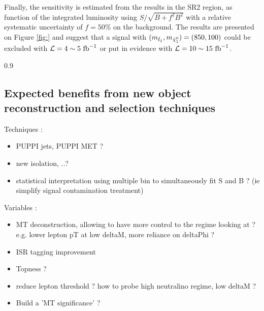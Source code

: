         \begin{table}
            \centering
            
            \caption{ \label{tab:phys14SignalRegions}}
        \end{table}

       Finally, the sensitivity is estimated from the results in the SR2 region, as function
       of the integrated luminosity using $S / \sqrt{B + f^2 B^2}$ with a relative systematic
       uncertainty of $f = 50\%$ on the background. The results are presented on Figure
       \ref{fig:} and suggest that a signal with $(m_{\tilde{t}_1}, m_{\tilde{\chi}_1^0}) = (850,100)$
       could be excluded with $\mathcal{L} = 4\sim5~\text{fb}^{-1}$ or put in evidence with
       $\mathcal{L} = 10\sim15~\text{fb}^{-1}$.

                         {0.9}
                         {}

         \subsection{Expected benefits from new object reconstruction and selection techniques}

            Techniques :
            \begin{itemize}
                \item PUPPI jets, PUPPI MET ?
                \item new isolation, ..?
                \item statistical interpretation using multiple bin to simultaneously fit S and B ? (ie simplify signal contamination treatment)
            \end{itemize}

            Variables :
            \begin{itemize}
                \item MT deconstruction, allowing to have more control to the regime looking at ? e.g. lower lepton pT  at low deltaM, more reliance on deltaPhi ?
                \item ISR tagging improvement
                \item Topness ?
                \item reduce lepton threshold ? how to probe high neutralino regime, low deltaM ?
                \item Build a 'MT significance' ?
            \end{itemize}

